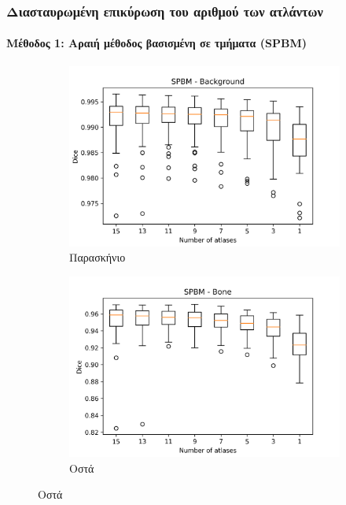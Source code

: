 \documentclass{beamer}
\begin{document}
\begin{frame}
\frametitle{Διασταυρωμένη επικύρωση του αριθμού των ατλάντων}
\framesubtitle{Μέθοδος 1: Αραιή μέθοδος βασισμένη σε τμήματα (SPBM)}

\begin{figure}[H]
    \centering

    \begin{subfigure}[b]{0.42\linewidth}
    \includegraphics[width=\linewidth]{SPBM_Number_of_atlases_Background_plot.png}
    \caption{Παρασκήνιο}
    \end{subfigure}
    \begin{subfigure}[b]{0.42\linewidth}
    \includegraphics[width=\linewidth]{SPBM_Number_of_atlases_Bone_plot.png}
    \caption{Οστά}
    \end{subfigure}


\end{figure}
\end{frame}
\end{document}
